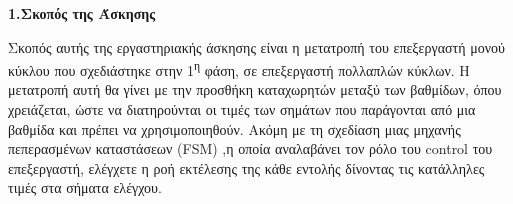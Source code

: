 { \large \bfseries 1.Σκοπός της Άσκησης}\\ %

\begin{justify}
Σκοπός αυτής της εργαστηριακής άσκησης είναι η μετατροπή του επεξεργαστή
μονού κύκλου που σχεδιάστηκε στην 1\textsuperscript{η} φάση, σε επεξεργαστή
πολλαπλών κύκλων. Η μετατροπή αυτή θα γίνει με την προσθήκη καταχωρητών
μεταξύ των βαθμίδων, όπου χρειάζεται, ώστε να διατηρούνται οι τιμές
των σημάτων που παράγονται από μια βαθμίδα και πρέπει να χρησιμοποιηθούν.
Ακόμη με τη σχεδίαση μιας μηχανής πεπερασμένων καταστάσεων (\textlatin{FSM})
,η οποία αναλαβάνει τον ρόλο του \textlatin{control} του επεξεργαστή,
ελέγχετε η ροή εκτέλεσης της κάθε εντολής δίνοντας τις κατάλληλες τιμές
στα σήματα ελέγχου.
\end{justify}


\vspace{0.5cm}